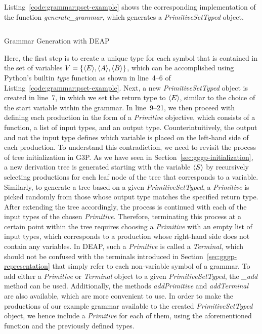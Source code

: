 Listing~\ref{code:grammar:pset-example} shows the corresponding implementation of the function \emph{generate\_grammar}, which generates a \emph{PrimitiveSetTyped} object.
\begin{listing}
	\inputminted[linenos]{python}{evostencils/grammar/pset_example.py}
	\caption{Grammar Generation with DEAP}
	\label{code:grammar:pset-example}
\end{listing}
Here, the first step is to create a unique type for each symbol that is contained in the set of variables $V = \left\{\langle E \rangle, \langle A \rangle, \langle B \rangle \right\}$, which can be accomplished using Python's builtin \emph{type} function as shown in line~4--6 of Listing~\ref{code:grammar:pset-example}.
Next, a new \emph{PrimitiveSetTyped} object is created in line~7, in which we set the return type to $\langle E \rangle$, similar to the choice of the start variable within the grammar.
In line~9--21, we then proceed with defining each production in the form of a \emph{Primitive} objective, which consists of a function, a list of input types, and an output type.
Counterintuitively, the output and not the input type defines which variable is placed on the left-hand side of each production.
To understand this contradiction, we need to revisit the process of tree initialization in G3P.
As we have seen in Section~\ref{sec:gggp-initialization}, a new derivation tree is generated starting with the variable $\langle S \rangle$ by recursively selecting productions for each leaf node of the tree that corresponds to a variable.
Similarly, to generate a tree based on a given \emph{PrimitiveSetTyped}, a \emph{Primitive} is picked randomly from those whose output type matches the specified return type.
After extending the tree accordingly, the process is continued with each of the input types of the chosen \emph{Primitive}.
Therefore, terminating this process at a certain point within the tree requires choosing a \emph{Primitive} with an empty list of input types, which corresponds to a production whose right-hand side does not contain any variables.
In DEAP, such a \emph{Primitive} is called a \emph{Terminal}, which should not be confused with the terminals introduced in Section~\ref{sec:gggp-representation} that simply refer to each non-variable symbol of a grammar.
To add either a \emph{Primitive} or \emph{Terminal} object to a given \emph{PrimitiveSetTyped}, the \emph{\_add} method can be used.
Additionally, the methods \emph{addPrimitive} and \emph{addTerminal} are also available, which are more convenient to use.
In order to make the productions of our example grammar available to the created \emph{PrimitiveSetTyped} object, we hence include a \emph{Primitive} for each of them, using the aforementioned function and the previously defined types.

